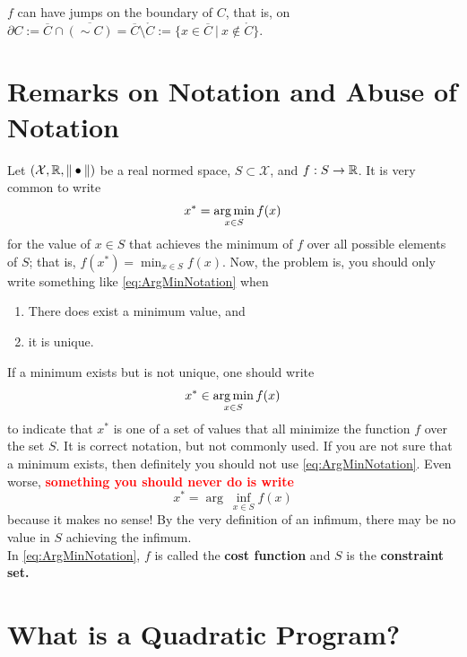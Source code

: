 \begin{rem} $f$ can have jumps on the boundary of $C$, that is, on $\partial C:= \overline{C} \cap \overline{(\sim C)} = \overline{C} \setminus \mathring{C} := \{ x \in \overline{C}~|~ x \not \in \mathring{C}\}$.
\end{rem}
    
\section{Remarks on Notation and Abuse of Notation}

Let $(\mathcal{X}, \mathbb R, \|\bullet\|)$ be a real normed space, $S \subset \mathcal{X}$, and $f:S \to \mathbb R$. It is very common to write
\begin{equation}
\label{eq:ArgMinNotation}
    x^\ast = \operatorname*{arg\,min}_{x \in S} f(x)
\end{equation}
for the value of $x\in S$ that achieves the minimum of $f$ over all possible elements of $S$; that is, $f(x^\ast) = \min_{x \in S} f(x)$. Now, the problem is, you should only write something like \eqref{eq:ArgMinNotation} when
\begin{enumerate}
    \item There does exist a minimum value, and 
    \item it is unique.
\end{enumerate}
If a minimum exists but is not unique, one should write
\begin{equation}
\label{eq:ArgMinNotation02}
    x^\ast \in \operatorname*{arg\,min}_{x \in S} f(x)
\end{equation}
to indicate that $x^\ast$ is one of a set of values that all minimize the function $f$ over the set $S$. It is correct notation, but not commonly used. If you are not sure that a minimum exists, then definitely you should not use \eqref{eq:ArgMinNotation}. Even worse,  \textcolor{red}{\bf something you should never do is write }
\begin{equation}
\label{eq:ArgMinNotation02}
    x^\ast = \arg~\inf_{x \in S} f(x)
\end{equation}
because it makes no sense! By the very definition of an infimum, there may be no value in $S$ achieving the infimum. \\

In \eqref{eq:ArgMinNotation}, $f$ is called the \textbf{cost function} and $S$ is the \textbf{constraint set.}

\section{What is a Quadratic Program?}

